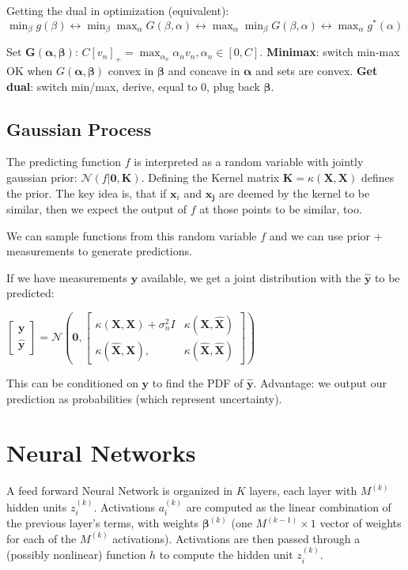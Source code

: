 \documentclass[10pt,a4paper,landscape]{article}
\renewcommand{\bf}[1]{\ensuremath{\mathbf{#1}}}
\newcommand{\balpha}{\boldsymbol\alpha}
\newcommand{\bbeta}{\boldsymbol\beta}
\begin{document}
\begin{multicols*}{4}
Getting the dual in optimization (equivalent):
$\min_{\beta} g(\beta) \leftrightarrow 
\min_{\beta} \max_{\alpha} G(\beta, \alpha) \leftrightarrow 
\max_{\alpha} \min_{\beta} G(\beta, \alpha) \leftrightarrow 
\max_{\alpha} g^*(\alpha)$

Set $\bf{G}(\balpha, \bbeta)$: $C[v_n]_+ = \max_{\alpha_n} \alpha_n v_n, \alpha_n \in [0, C]$.
\textbf{Minimax}: switch min-max OK when $G(\balpha, \bbeta)$ convex in $\bbeta$ and concave in $\balpha$ and sets are convex.
\textbf{Get dual}: switch min/max, derive, equal to 0, plug back $\bbeta$.

\subsection{Gaussian Process}
The predicting function $f$ is interpreted as a random variable with jointly gaussian prior: $\mathcal{N}(f | \bf{0}, \bf{K})$.
Defining the Kernel matrix $\bf{K} = \kappa(\bf{X}, \bf{X})$ defines the prior. The key idea is, that if $\bf{x}_i$ and $\bf{x_j}$ are
deemed by the kernel to be similar, then we expect the output of $f$ at those points to be similar, too.

We can sample functions from this random variable $f$ and we can use prior + measurements to generate predictions.

If we have measurements $\bf{y}$ available, we get a joint distribution with the $\bf{\hat{y}}$ to be predicted:

$
\begin{bmatrix}
  \bf{y} \\
  \bf{\hat{y}}
\end{bmatrix}
=
\mathcal{N} \left(
  \bf{0},
  \begin{bmatrix}
    \kappa(\bf{X}, \bf{X}) + \sigma_n^2 I  & \kappa(\bf{X}, \bf{\hat{X}}) \\
    \kappa(\bf{\hat{X}}, \bf{X}),          & \kappa(\bf{\hat{X}}, \bf{\hat{X}})
  \end{bmatrix}
\right)
$

This can be conditioned on $\bf{y}$ to find the PDF of $\bf{\hat{y}}$. Advantage: we output our prediction as probabilities (which represent uncertainty).

\section{Neural Networks}
A feed forward Neural Network is organized in $K$ layers, each layer with $M^{(k)}$ hidden units $z_i^{(k)}$. Activations $a_i^{(k)}$ are computed as the linear combination of the previous layer's terms, with weights $\bbeta^{(k)}$ (one $M^{(k-1)} \times 1$ vector of weights for each of the $M^{(k)}$ activations). Activations are then passed through a (possibly nonlinear) function $h$ to compute the hidden unit $z_i^{(k)}$.


\end{multicols*}
\end{document}

